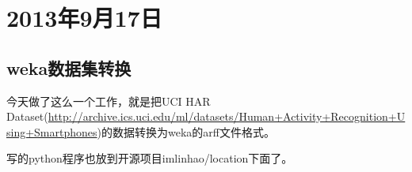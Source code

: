 \chapter{2013年9月17日}
\section{weka数据集转换}
今天做了这么一个工作，就是把UCI HAR Dataset(\url{http://archive.ics.uci.edu/ml/datasets/Human+Activity+Recognition+Using+Smartphones})的数据转换为weka的arff文件格式。

写的python程序也放到开源项目imlinhao/location下面了。
